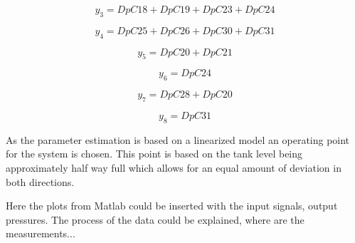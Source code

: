 \vspace{4mm}
\begin {equation}
    y_3 = DpC18 + DpC19 + DpC23 + DpC24 
\end{equation}

\vspace{4mm}
\begin {equation}
    y_4 = DpC25 + DpC26 + DpC30 + DpC31 
\end{equation}

\vspace{4mm}
\begin {equation}
     y_5 = DpC20 + DpC21  
\end{equation}

\vspace{4mm}
\begin {equation}
     y_6 = DpC24
\end{equation}


\vspace{4mm}
\begin {equation}
     y_7 = DpC28 + DpC20 
\end{equation}

\vspace{4mm}
\begin {equation}
     y_8 = DpC31 
\end{equation}

As the parameter estimation is based on a linearized model an operating point for the system is chosen. This point is based on the tank level being approximately half way full which allows for an equal amount of deviation in both directions.   

Here the plots from Matlab could be inserted with the input signals, output pressures. The process of the data could be explained, where are the measurements...


